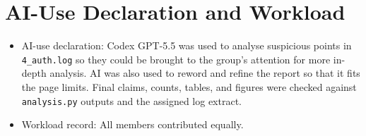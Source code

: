 \documentclass[10pt,a4paper]{article}
\begin{document}
\section{AI-Use Declaration and Workload}
\label{app:ai-workload}
\setcounter{table}{0}
\setcounter{figure}{0}
\begin{itemize}
    \item AI-use declaration: Codex GPT-5.5 was used to analyse suspicious points in \texttt{4\_auth.log} so they could be brought to the group's attention for more in-depth analysis. AI was also used to reword and refine the report so that it fits the page limits. Final claims, counts, tables, and figures were checked against \texttt{analysis.py} outputs and the assigned log extract.
    \item Workload record: All members contributed equally.
\end{itemize}
\end{document}
